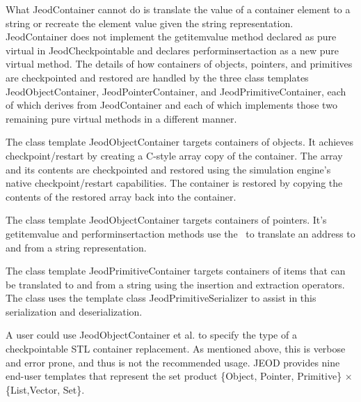 What JeodContainer cannot do is translate the value of a container element to a
string or recreate the element value given the string representation.
JeodContainer does not implement the get\funder{}item\funder{}value method
declared as pure virtual in JeodCheckpointable and declares
perform\funder{}insert\funder{}action as a new pure
virtual method. The details of how containers of objects, pointers, and
primitives are checkpointed and restored are handled by the three class
templates JeodObjectContainer, JeodPointerContainer, and JeodPrimitiveContainer,
each of which derives from JeodContainer and each of which implements
those two remaining pure virtual methods in a different manner.

The class template JeodObjectContainer targets containers of objects.
It achieves checkpoint/restart by creating a C-style array copy of the
container. The array and its contents are checkpointed and restored using
the simulation engine's native checkpoint/restart capabilities. The
container is restored by copying the contents of the restored array back
into the container.

The class template JeodObjectContainer targets containers of pointers. It's
get\funder{}item\funder{}value and perform\funder{}insert\funder{}action methods
use the \SIMINTERFACE\ to translate an address to and from a
string representation.

The class template JeodPrimitiveContainer targets containers of items
that can be translated to and from a string using the insertion and
extraction operators. The class uses the template class JeodPrimitiveSerializer
to assist in this serialization and deserialization.

A user could use JeodObjectContainer et al. to specify the type of a
checkpointable STL container replacement. As mentioned above, this is
verbose and error prone, and thus is not the recommended usage.
JEOD provides nine end-user templates that represent the set product
\{Object, Pointer, Primitive\} $\times$ \{List,Vector, Set\}.

\clearpage
\boilerplateinventory
